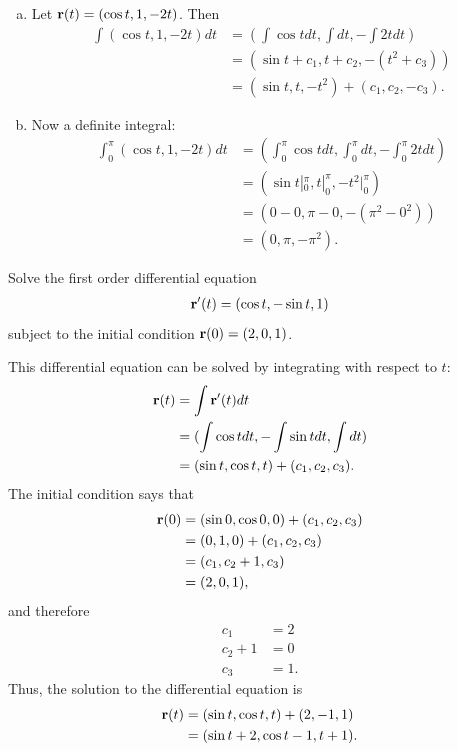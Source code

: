 \documentclass[12pt,letterpaper,reqno]{article}
\numberwithin{equation}{section}
\newcommand{\bbr}{{\bf r}}
\begin{document}
{\begin{example}
\begin{enumerate}[(a)]
	\item Let $\bbr(t)=(\cos t, 1, -2t)$. Then
\begin{align*}
	\int (\cos t, 1, -2t)dt&=\left(\int \cos t dt,\int dt,-\int 2t dt\right) \\
	&=(\sin t+c_1,t+c_2,-(t^2+c_3)) \\
	&=(\sin t, t, -t^2)+(c_1,c_2,-c_3).
\end{align*}
\item Now a definite integral:
\begin{align*}
	\int_0^\pi (\cos t, 1, -2t)dt&=\left(\int_0^\pi \cos t dt,\int_0^\pi dt,-\int_0^\pi 2t dt\right) \\
	&=(\sin t|_0^\pi,t|_0^\pi,-t^2|_0^\pi) \\
	&=(0-0,\pi-0,-(\pi^2-0^2)) \\
	&=(0,\pi,-\pi^2).
\end{align*}
\end{enumerate}	
\end{example}

\begin{exercise}
	Solve the first order differential equation
	\begin{align*}
		\bbr'(t)=(\cos t,-\sin t,1)
	\end{align*}
	subject to the initial condition $\bbr(0)=(2,0,1)$.
\end{exercise}

{\color{red}
\begin{solution}
	This differential equation can be solved by integrating with respect to $t$:
	\begin{align*}
		\bbr(t)&=\int \bbr'(t)dt \\
		&=(\int \cos t dt,-\int \sin t dt, \int dt) \\
		&=(\sin t, \cos t, t)+(c_1,c_2,c_3).
	\end{align*}
	The initial condition says that
	\begin{align*}
		\bbr(0)&=(\sin 0, \cos 0, 0)+(c_1,c_2,c_3) \\
		&=(0,1,0)+(c_1,c_2,c_3) \\
		&=(c_1,c_2+1,c_3) \\
		&=(2,0,1),
	\end{align*}
	and therefore
	\begin{align*}
		c_1&=2 \\
		c_2+1&=0 \\
		c_3&=1.
	\end{align*}
	Thus, the solution to the differential equation is
	\begin{align*}
		\bbr(t)&=(\sin t, \cos t, t)+(2,-1,1) \\
		&=(\sin t+2, \cos t-1,t+1).
	\end{align*}
	

\end{solution}}}
\end{document}
